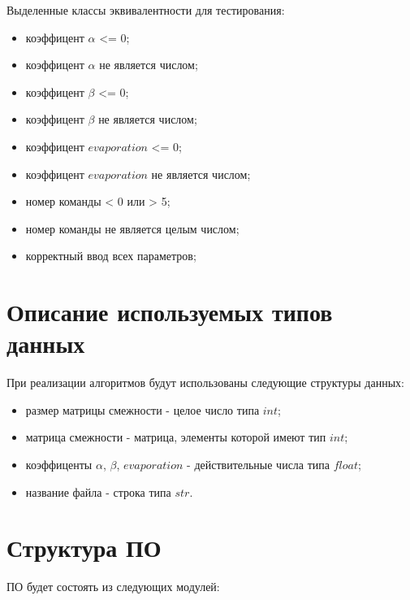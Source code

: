 Выделенные классы эквивалентности для тестирования:

\begin{itemize}
	\item коэффицент $\alpha$ <= 0;
	\item коэффицент $\alpha$ не является числом;
	\item коэффицент $\beta$ <= 0;
	\item коэффицент $\beta$ не является числом;
	\item коэффицент $evaporation$ <= 0;
	\item коэффицент $evaporation$ не является числом;
	\item номер команды < 0 или > 5;
	\item номер команды не является целым числом;
	\item корректный ввод всех параметров;
\end{itemize}

\section{Описание используемых типов данных}

При реализации алгоритмов будут использованы следующие структуры данных:

\begin{itemize}
	\item размер матрицы смежности - целое число типа $int$;
	\item матрица смежности - матрица, элементы которой имеют тип $int$;
	\item коэффиценты $\alpha$, $\beta$, $evaporation$ - действительные числа типа $float$;
	\item название файла - строка типа $str$.
\end{itemize}

\section{Структура ПО}

ПО будет состоять из следующих модулей:

